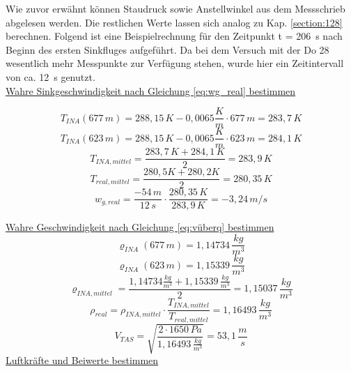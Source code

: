 \noindent Wie zuvor erwähnt können Staudruck sowie Anstellwinkel aus dem Messschrieb abgelesen werden. Die restlichen Werte lassen sich analog zu Kap. \ref{section:128} berechnen. Folgend ist eine Beispielrechnung für den Zeitpunkt t = 206~s nach Beginn des ersten Sinkfluges aufgeführt. Da bei dem Versuch mit der Do 28 wesentlich mehr Messpunkte zur Verfügung stehen, wurde hier ein Zeitintervall von ca. 12~s genutzt. \\

\noindent 
\underline{Wahre Sinkgeschwindigkeit nach Gleichung \ref{eq:wg_real} bestimmen}

\begin{equation*}
T_{INA}(677\,m) = 288,15\,K - 0,0065 \frac{K}{m} \cdot 677\,m = 283,7\,K
\end{equation*}
\begin{equation*}
T_{INA}(623\,m) = 288,15\,K - 0,0065 \frac{K}{m} \cdot 623\,m = 284,1\,K
\end{equation*}
\begin{equation*}
T_{INA,mittel} = \frac{283,7\,K + 284,1\,K}{2} = 283,9\,K
\end{equation*}
\begin{equation*}
T_{real,mittel} = \frac{280,5 K + 280,2 K}{2} =	280,35\,K
\end{equation*}
\begin{equation*}
w_{g,real} = \frac{-54\,m}{12\,s} \cdot \frac{280,35\,K}{283,9\,K} = - 3,24\,m/s
\end{equation*}

\vspace{5mm}


\noindent
\underline{Wahre Geschwindigkeit nach Gleichung \ref{eq:vüberq} bestimmen}
\begin{equation*}
\varrho_{INA}(677\,m) = 1,14734\,\frac{kg}{m^3}
\end{equation*}
\begin{equation*}
\varrho_{INA}(623\,m) = 1,15339\,\frac{kg}{m^3}
\end{equation*}
\begin{equation*}
\varrho_{INA,mittel} = \frac{1,14734\frac{kg}{m^3} + 1,15339\,\frac{kg}{m^3}}{2} = 1,15037\,\frac{kg}{m^3}
\end{equation*}
\begin{equation*}
\rho_{real} = \rho_{INA,mittel} \cdot \frac{T_{INA,mittel}}{T_{real,mittel}} = 1,16493\,\frac{kg}{m^3}
\end{equation*}
\vspace{5mm}
\begin{equation*}
V_{TAS} = \sqrt{\frac{2 \cdot 1650\,Pa}{1,16493\,\frac{kg}{m^3}}} = 53,1 \,\frac{m}{s}
\end{equation*}
\newpage 
\noindent
\underline{Luftkräfte und Beiwerte bestimmen}

